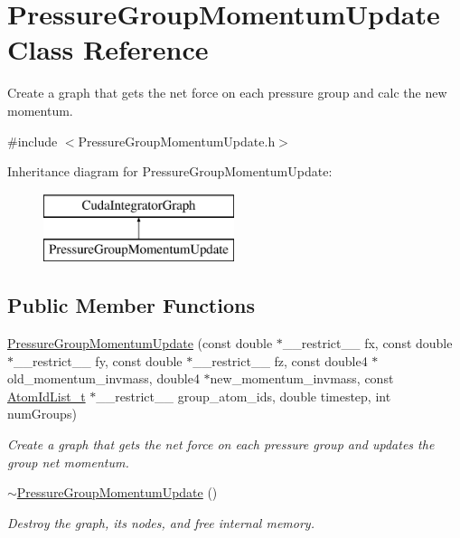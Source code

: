 \hypertarget{classPressureGroupMomentumUpdate}{}\section{Pressure\+Group\+Momentum\+Update Class Reference}
\label{classPressureGroupMomentumUpdate}


Create a graph that gets the net force on each pressure group and calc the new momentum.  




{\ttfamily \#include $<$Pressure\+Group\+Momentum\+Update.\+h$>$}

Inheritance diagram for Pressure\+Group\+Momentum\+Update\+:\begin{figure}[H]
\begin{center}
\leavevmode
\includegraphics[height=2.000000cm]{classPressureGroupMomentumUpdate}
\end{center}
\end{figure}
\subsection*{Public Member Functions}
\begin{DoxyCompactItemize}
\item 
\hyperlink{classPressureGroupMomentumUpdate_a2bfd6839085a1c51d0e2354dd1626763}{Pressure\+Group\+Momentum\+Update} (const double $\ast$\+\_\+\+\_\+restrict\+\_\+\+\_\+ fx, const double $\ast$\+\_\+\+\_\+restrict\+\_\+\+\_\+ fy, const double $\ast$\+\_\+\+\_\+restrict\+\_\+\+\_\+ fz, const double4 $\ast$old\+\_\+momentum\+\_\+invmass, double4 $\ast$new\+\_\+momentum\+\_\+invmass, const \hyperlink{structAtomIdList__t}{Atom\+Id\+List\+\_\+t} $\ast$\+\_\+\+\_\+restrict\+\_\+\+\_\+ group\+\_\+atom\+\_\+ids, double timestep, int num\+Groups)
\begin{DoxyCompactList}\small\item\em Create a graph that gets the net force on each pressure group and updates the group net momentum. \end{DoxyCompactList}\item 
\hyperlink{classPressureGroupMomentumUpdate_aa41078d9fadcd907d39c9ba18b3920ca}{$\sim$\+Pressure\+Group\+Momentum\+Update} ()
\begin{DoxyCompactList}\small\item\em Destroy the graph, its nodes, and free internal memory. \end{DoxyCompactList}\end{DoxyCompactItemize}

